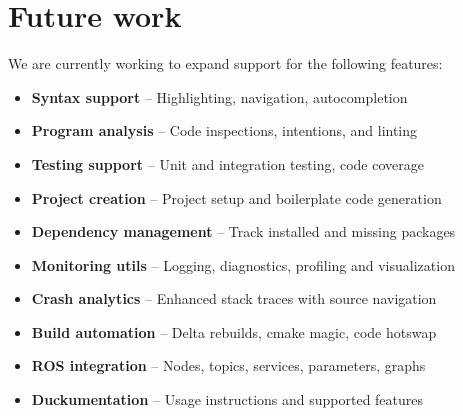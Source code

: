 \documentclass[12pt,initial,twoside,maitrise]{dms}
\numberwithin{equation}{section}
\numberwithin{table}{chapter}
\numberwithin{figure}{chapter}
\begin{document}
\section{Future work}
\noindent We are currently working to expand support for the following features:
%
\begin{itemize}
\item \textbf{Syntax support} -- Highlighting, navigation, autocompletion
\item \textbf{Program analysis} -- Code inspections, intentions, and linting
\item \textbf{Testing support} -- Unit and integration testing, code coverage
\item \textbf{Project creation} -- Project setup and boilerplate code generation
\item \textbf{Dependency management} -- Track installed and missing packages
\item \textbf{Monitoring utils} -- Logging, diagnostics, profiling and visualization
\item \textbf{Crash analytics} -- Enhanced stack traces with source navigation
\item \textbf{Build automation} -- Delta rebuilds, cmake magic, code hotswap
\item \textbf{ROS integration} -- Nodes, topics, services, parameters, graphs
\item \textbf{Duckumentation} -- Usage instructions and supported features
\end{itemize}
%
\end{document}
